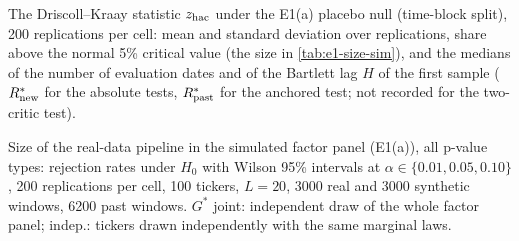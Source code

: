 \begin{table}[tbp]
  \centering
  \caption{The Driscoll--Kraay statistic $\zhac$ under the E1(a) placebo null (time-block split),
    200 replications per cell: mean and standard deviation over replications, share above the
    normal 5\% critical value (the size in \cref{tab:e1-size-sim}), and the medians of the number
    of evaluation dates and of the Bartlett lag $H$ of the first sample ($\Rnew^*$ for the
    absolute tests, $\Rpast^*$ for the anchored test; not recorded for the two-critic test).}
  \label{tab:e1-sim-z}
  \small
\end{table}

\begin{table}[p]
  \centering
  \caption{Size of the real-data pipeline in the simulated factor panel (E1(a)), all p-value
    types: rejection rates under $H_0$ with Wilson 95\% intervals at
    $\alpha\in\{0.01,0.05,0.10\}$, 200 replications per cell, 100 tickers, $L=20$, 3000 real and
    3000 synthetic \TEST{} windows, 6200 past windows. $G^*$ joint: independent draw of the whole
    factor panel; indep.: tickers drawn independently with the same marginal laws.}
  \label{tab:e1-size-sim-full}
  \scriptsize
\end{table}

\clearpage
